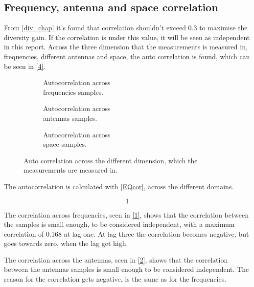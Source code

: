 \subsection{Frequency, antenna and space correlation}
From \autoref{div_chap} it's found that correlation shouldn't exceed 0.3 to maximise the diversity gain. If the correlation is under this value, it will be seen as independent in this report. Across the three dimension that the measurements is measured in, frequencies, different antennas and space, the auto correlation is found, which can be seen in \autoref{4}.

\begin{figure}[H]
\captionsetup{belowskip=0em}
\centering
\begin{subfigure}[b]{0.326\textwidth}

\caption{Autocorrelation across \\ frequencies samples.}
\label{1}
\end{subfigure}
\begin{subfigure}[b]{0.326\textwidth}

\caption{Autocorrelation across \\antennas samples.}
\label{2}
\end{subfigure}
\begin{subfigure}[b]{0.326\textwidth}

\caption{Autocorrelation across \\space samples.}
\label{3}
\end{subfigure}
\captionsetup{belowskip=-1.5em}
\caption{Auto correlation across the different dimension, which the measurements are measured in.}
\label{4}
\end{figure}

The autocorrelation is calculated with \autoref{EQcor}, across the different domains.

\begin{equation}
1
\label{EQcor}
\end{equation}

The correlation across frequencies, seen in \autoref{1}, shows that the correlation between the samples is small enough, to be considered independent, with a maximum correlation of 0.168 at lag one. At lag three the correlation becomes negative, but goes towards zero, when the lag get high. 

The correlation across the antennas, seen in \autoref{2}, shows that the correlation between the antennas samples is small enough to be considered independent. The reason for the correlation gets negative, is the same as for the frequencies.

